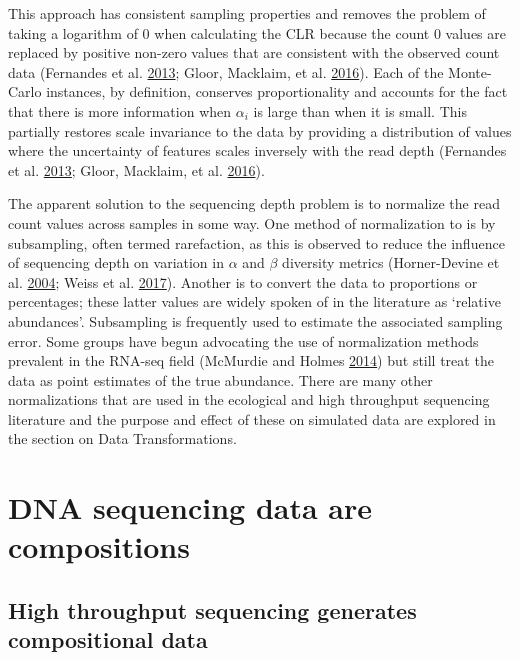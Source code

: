 \documentclass[onecolumn]{book}
\theoremstyle{definition}
\theoremstyle{definition}
\theoremstyle{definition}
\theoremstyle{remark}
\begin{document}
This approach has consistent sampling properties and removes the problem
of taking a logarithm of 0 when calculating the CLR because the count 0
values are replaced by positive non-zero values that are consistent with
the observed count data (Fernandes et al.
\protect\hyperlink{ref-fernandes:2013}{2013}; Gloor, Macklaim, et al.
\protect\hyperlink{ref-gloorAJS:2016}{2016}). Each of the Monte-Carlo
instances, by definition, conserves proportionality and accounts for the
fact that there is more information when \(\alpha_i\) is large than when
it is small. This partially restores scale invariance to the data by
providing a distribution of values where the uncertainty of features
scales inversely with the read depth (Fernandes et al.
\protect\hyperlink{ref-fernandes:2013}{2013}; Gloor, Macklaim, et al.
\protect\hyperlink{ref-gloorAJS:2016}{2016}).

The apparent solution to the sequencing depth problem is to normalize
the read count values across samples in some way. One method of
normalization to is by subsampling, often termed rarefaction, as this is
observed to reduce the influence of sequencing depth on variation in
\(\alpha\) and \(\beta\) diversity metrics (Horner-Devine et al.
\protect\hyperlink{ref-Horner-Devine:2004aa}{2004}; Weiss et al.
\protect\hyperlink{ref-Weiss:2017aa}{2017}). Another is to convert the
data to proportions or percentages; these latter values are widely
spoken of in the literature as `relative abundances'. Subsampling is
frequently used to estimate the associated sampling error. Some groups
have begun advocating the use of normalization methods prevalent in the
RNA-seq field (McMurdie and Holmes
\protect\hyperlink{ref-McMurdie:2014a}{2014}) but still treat the data
as point estimates of the true abundance. There are many other
normalizations that are used in the ecological and high throughput
sequencing literature and the purpose and effect of these on simulated
data are explored in the section on Data Transformations.

\hypertarget{CoDa}{%
\chapter{DNA sequencing data are compositions}\label{CoDa}}

\hypertarget{high-throughput-sequencing-generates-compositional-data}{%
\section{High throughput sequencing generates compositional
data}\label{high-throughput-sequencing-generates-compositional-data}}
\end{document}
